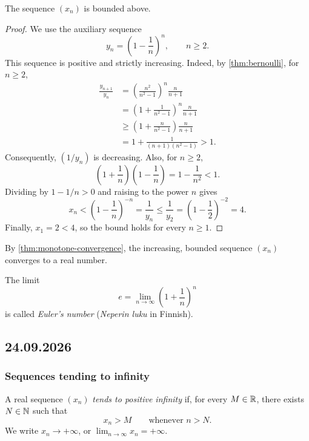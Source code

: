 \documentclass[11pt,a4paper]{amsart}
\begin{document}
\begin{lemma}
  The sequence \((x_n)\) is bounded above.
\end{lemma}

\begin{proof}
  We use the auxiliary sequence
  \[
    y_n=\left(1-\frac{1}{n}\right)^n,\qquad n\geq2.
  \]
  This sequence is positive and strictly increasing. Indeed, by
  \cref{thm:bernoulli}, for \(n\geq2\),
  \begin{align*}
    \frac{y_{n+1}}{y_n}
    &=\left(\frac{n^2}{n^2-1}\right)^n\frac{n}{n+1}\\
    &=\left(1+\frac{1}{n^2-1}\right)^n\frac{n}{n+1}\\
    &\geq\left(1+\frac{n}{n^2-1}\right)\frac{n}{n+1}\\
    &=1+\frac{1}{(n+1)(n^2-1)}>1.
  \end{align*}
  Consequently, \((1/y_n)\) is decreasing. Also, for \(n\geq2\),
  \[
    \left(1+\frac{1}{n}\right)\left(1-\frac{1}{n}\right)
    =1-\frac{1}{n^2}<1.
  \]
  Dividing by \(1-1/n>0\) and raising to the power \(n\) gives
  \[
    x_n<\left(1-\frac{1}{n}\right)^{-n}
    =\frac{1}{y_n}\leq\frac{1}{y_2}
    =\left(1-\frac{1}{2}\right)^{-2}=4.
  \]
  Finally, \(x_1=2<4\), so the bound holds for every \(n\geq1\).
\end{proof}

By \cref{thm:monotone-convergence}, the increasing, bounded sequence
\((x_n)\) converges to a real number.

\begin{definition}
  The limit
  \[
    e=\lim_{n\to\infty}\left(1+\frac{1}{n}\right)^n
  \]
  is called \emph{Euler's number} (\emph{Neperin luku} in Finnish).
\end{definition}

\subsection{24.09.2026}

\subsubsection{Sequences tending to infinity}

\begin{definition}
  A real sequence \((x_n)\) \emph{tends to positive infinity} if, for
  every \(M\in\mathbb{R}\), there exists \(N\in\mathbb{N}\) such that
  \[
    x_n>M\qquad\text{whenever }n>N.
  \]
  We write \(x_n\to+\infty\), or
  \(\lim_{n\to\infty}x_n=+\infty\).
\end{definition}
\end{document}
